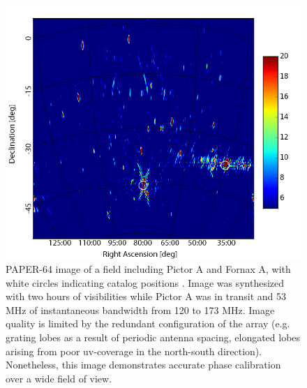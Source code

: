 \documentclass[twocolumn,numberedappendix]{emulateapj} \shorttitle{PSA64}
\begin{document}
\begin{figure}
\centering
\includegraphics[width=\columnwidth]{plots/picimg_cs.png}
\caption{
PAPER-64 image of a field including Pictor A and Fornax A, with white circles
indicating catalog positions \citep{jacobs_et_al2011}. Image was synthesized with two hours
of visibilities while Pictor A was in transit and 53 MHz of instantaneous
bandwidth from 120 to 173 MHz.  Image quality is limited by the redundant
configuration of the array (e.g. grating lobes as a result of periodic antenna
spacing, elongated lobes arising from poor uv-coverage in the north-south
direction).  Nonetheless, this image demonstrates accurate phase calibration
over a wide field of view.
} \label{fig:field_image}
\end{figure}
\end{document}
